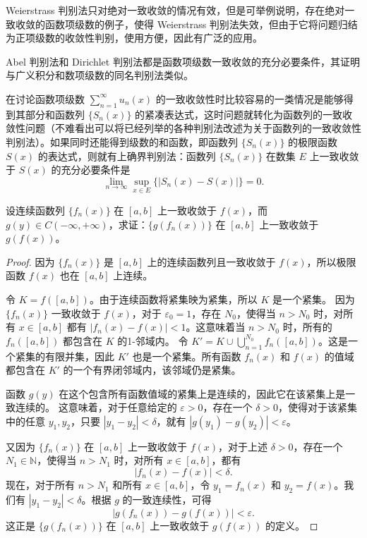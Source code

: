 \documentclass[lang=cn,10pt,thmcnt=section]{elegantbook}
\begin{document}
Weierstrass 判别法只对绝对一致收敛的情况有效，但是可举例说明，存在绝对一致收敛的函数项级数的例子，使得 Weierstrass 判别法失效，但由于它将问题归结为正项级数的收敛性判别，使用方便，因此有广泛的应用。

Abel 判别法和 Dirichlet 判别法都是函数项级数一致收敛的充分必要条件，其证明与广义积分和数项级数的同名判别法类似。

在讨论函数项级数 $\sum_{n=1}^{\infty} u_n(x)$ 的一致收敛性时比较容易的一类情况是能够得到其部分和函数列 $\{S_n(x)\}$ 的紧凑表达式，这时问题就转化为函数列的一致收敛性问题（不难看出可以将已经列举的各种判别法改述为关于函数列的一致收敛性判别法）。如果同时还能得到级数的和函数，即函数列 $\{S_n(x)\}$ 的极限函数 $S(x)$ 的表达式，则就有上确界判别法：函数列 $\{S_n(x)\}$ 在数集 $E$ 上一致收敛于 $S(x)$ 的充分必要条件是
\[
\lim_{n \to \infty} \sup_{x \in E} \{|S_n(x) - S(x)|\} = 0.
\]
\begin{example}
	设连续函数列 $\{f_n(x)\}$ 在 $[a,b]$ 上一致收敛于 $f(x)$，而 $g(y) \in C(-\infty, +\infty)$，求证：$\{g(f_n(x))\}$ 在 $[a,b]$ 上一致收敛于 $g(f(x))$。
	\end{example}
	\begin{proof}
		因为 $\{f_n(x)\}$ 是 $[a,b]$ 上的连续函数列且一致收敛于 $f(x)$，所以极限函数 $f(x)$ 也在 $[a,b]$ 上连续。
		
		令 $K = f([a,b])$。由于连续函数将紧集映为紧集，所以 $K$ 是一个紧集。
		因为 $\{f_n(x)\}$ 一致收敛于 $f(x)$，对于 $\varepsilon_0 = 1$，存在 $N_0$，使得当 $n > N_0$ 时，对所有 $x \in [a,b]$ 都有 $|f_n(x) - f(x)| < 1$。这意味着当 $n>N_0$ 时，所有的 $f_n([a,b])$ 都包含在 $K$ 的1-邻域内。
		令 $K' = K \cup \bigcup_{n=1}^{N_0} f_n([a,b])$。这是一个紧集的有限并集，因此 $K'$ 也是一个紧集。所有函数 $f_n(x)$ 和 $f(x)$ 的值域都包含在 $K'$ 的一个有界闭邻域内，该邻域仍是紧集。
		
		函数 $g(y)$ 在这个包含所有函数值域的紧集上是连续的，因此它在该紧集上是一致连续的。
		这意味着，对于任意给定的 $\varepsilon > 0$，存在一个 $\delta > 0$，使得对于该紧集中的任意 $y_1, y_2$，只要 $|y_1 - y_2| < \delta$，就有 $|g(y_1) - g(y_2)| < \varepsilon$。
		
		又因为 $\{f_n(x)\}$ 在 $[a,b]$ 上一致收敛于 $f(x)$，对于上述 $\delta > 0$，存在一个 $N_1 \in \mathbb{N}$，使得当 $n > N_1$ 时，对所有 $x \in [a,b]$，都有
		\[ |f_n(x) - f(x)| < \delta. \]
		现在，对于所有 $n > N_1$ 和所有 $x \in [a,b]$，令 $y_1 = f_n(x)$ 和 $y_2 = f(x)$。我们有 $|y_1 - y_2| < \delta$。根据 $g$ 的一致连续性，可得
		\[ |g(f_n(x)) - g(f(x))| < \varepsilon. \]
		这正是 $\{g(f_n(x))\}$ 在 $[a,b]$ 上一致收敛于 $g(f(x))$ 的定义。
	\end{proof}
	
\end{document}
